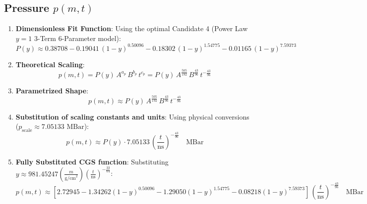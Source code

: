 \documentclass[11pt]{article}
\begin{document}
\subsection{Pressure $p(m,t)$}
\begin{enumerate}
    \item \textbf{Dimensionless Fit Function}:
    Using the optimal Candidate 4 (Power Law $y=1$ 3-Term 6-Parameter model):
    $$P(y) \approx 0.38708 - 0.19041 \, (1-y)^{0.50096} - 0.18302 \, (1-y)^{1.54775} - 0.01165 \, (1-y)^{7.59373}$$
    
    \item \textbf{Theoretical Scaling}:
    $$p(m,t) = P(y) \, A^{a_p} \, B^{b_p} \, t^{c_p} = P(y) \, A^{\frac{505}{192}} \, B^{\frac{43}{96}} \, t^{-\frac{43}{96}}$$
    
    \item \textbf{Parametrized Shape}:
    $$p(m,t) \approx P(y) \, A^{\frac{505}{192}} \, B^{\frac{43}{96}} \, t^{-\frac{43}{96}}$$
    
    \item \textbf{Substitution of scaling constants and units}:
    Using physical conversions ($p_{\text{scale}} \approx 7.05133 \text{ MBar}$):
    $$p(m,t) \approx P(y) \cdot 7.05133 \, \left(\frac{t}{\text{ns}}\right)^{-\frac{43}{96}} \quad \text{MBar}$$
    
    \item \textbf{Fully Substituted CGS function}:
    Substituting $y \approx 981.45247 \left(\frac{m}{\text{g/cm}^2}\right) \left(\frac{t}{\text{ns}}\right)^{-\frac{33}{64}}$:
    $$p(m,t) \approx \left[ 2.72945 - 1.34262 (1-y)^{0.50096} - 1.29050 (1-y)^{1.54775} - 0.08218 (1-y)^{7.59373} \right] \, \left(\frac{t}{\text{ns}}\right)^{-\frac{43}{96}} \quad \text{MBar}$$
\end{enumerate}
\end{document}
